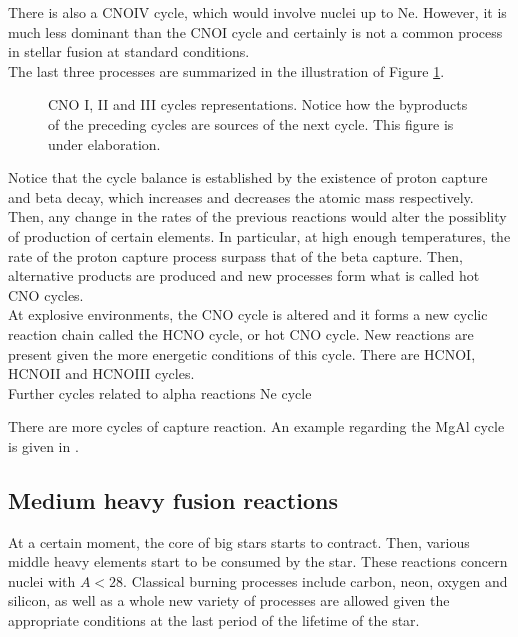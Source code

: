 \documentclass[openany]{book}
\begin{document}
There is also a CNOIV cycle, which would involve nuclei up to Ne. However, it is much less dominant than the CNOI cycle and certainly is not a common process in stellar fusion at standard conditions. \\

The last three processes are summarized in the illustration of Figure \ref{fig:CNOcyles}.

\begin{figure}[H]
	
	\caption[CNO I, II and III cycles representations]{CNO I, II and III cycles representations. Notice how the byproducts of the preceding cycles are sources of the next cycle. This figure is under elaboration.}
	\label{fig:CNOcyles}
\end{figure}

Notice that the cycle balance is established by the existence of proton capture and beta decay, which increases and decreases the atomic mass respectively. Then, any change in the rates of the previous reactions would alter the possiblity of production of certain elements. In particular, at high enough temperatures, the rate of the proton capture process surpass that of the beta capture. Then, alternative products are produced and new processes form what is called hot CNO cycles. \\ 

At explosive environments, the CNO cycle is altered and it forms a new cyclic reaction chain called the HCNO cycle, or hot CNO cycle.  New reactions are present given the more energetic conditions of this cycle. There are HCNOI, HCNOII and HCNOIII cycles. \\

Further cycles related to alpha reactions Ne cycle \cite{kaeppeler_wiescher_giesen_goerres_baraffe_eleid_raiteri_busso_gallino_limongi_et_1994}

There are more cycles of capture reaction. An example regarding the MgAl cycle is given in \cite{lotay_doherty_janssens_seweryniak_albers_almaraz-calderon_carpenter_champagne_chiara_hoffman_et_2022}.


\subsection{Medium heavy fusion reactions} \label{sub:mediumHeavyReactions}

At a certain moment, the core of big stars starts to contract. Then, various middle heavy elements start to be consumed by the star. These reactions concern nuclei with $A < 28$. Classical burning processes include carbon, neon, oxygen and silicon, as well as a whole new variety of processes are allowed given the appropriate conditions at the last period of the lifetime of the star. \\
\end{document}
